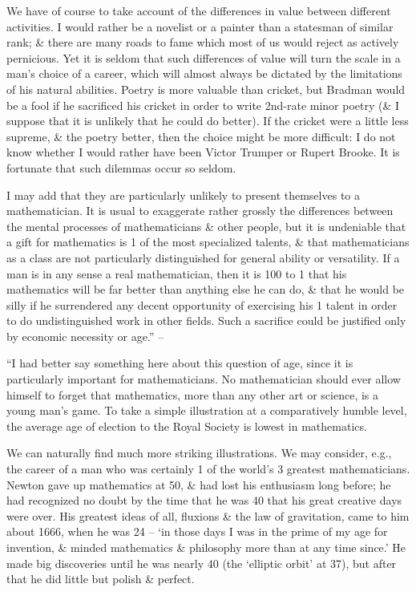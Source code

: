 \documentclass{article}
\numberwithin{equation}{section}
\begin{document}
We have of course to take account of the differences in value between different activities. I would rather be a novelist or a painter than a statesman of similar rank; \& there are many roads to fame which most of us would reject as actively pernicious. Yet it is seldom that such differences of value will turn the scale in a man's choice of a career, which will almost always be dictated by the limitations of his natural abilities. Poetry is more valuable than cricket, but Bradman would be a fool if he sacrificed his cricket in order to write 2nd-rate minor poetry (\& I suppose that it is unlikely that he could do better). If the cricket were a little less supreme, \& the poetry better, then the choice might be more difficult: I do not know whether I would rather have been Victor Trumper or Rupert Brooke. It is fortunate that such dilemmas occur so seldom.

I may add that they are particularly unlikely to present themselves to a mathematician. It is usual to exaggerate rather grossly the differences between the mental processes of mathematicians \& other people, but it is undeniable that a gift for mathematics is 1 of the most specialized talents, \& that mathematicians as a class are not particularly distinguished for general ability or versatility. If a man is in any sense a real mathematician, then it is 100 to 1 that his mathematics will be far better than anything else he can do, \& that he would be silly if he surrendered any decent opportunity of exercising his 1 talent in order to do undistinguished work in other fields. Such a sacrifice could be justified only by economic necessity or age.'' -- \cite[pp. 66--70]{Hardy1992}

 ``I had better say something here about this question of age, since it is particularly important for mathematicians. No mathematician should ever allow himself to forget that mathematics, more than any other art or science, is a young man's game. To take a simple illustration at a comparatively humble level, the average age of election to the Royal Society is lowest in mathematics.

We can naturally find much more striking illustrations. We may consider, e.g., the career of a man who was certainly 1 of the world's 3 greatest mathematicians. Newton gave up mathematics at 50, \& had lost his enthusiasm long before; he had recognized no doubt by the time that he was 40 that his great creative days were over. His greatest ideas of all, fluxions \& the law of gravitation, came to him about 1666, when he was 24 -- `in those days I was in the prime of my age for invention, \& minded mathematics \& philosophy more than at any time since.' He made big discoveries until he was nearly 40 (the `elliptic orbit' at 37), but after that he did little but polish \& perfect.
\end{document}
